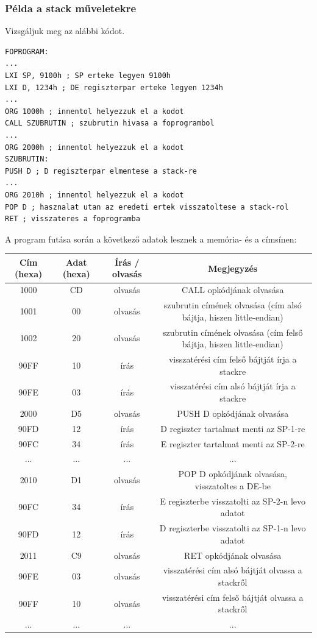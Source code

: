 \documentclass{article}
\begin{document}
\subsubsection{Példa a stack műveletekre}
Vizsgáljuk meg az alábbi kódot.
\begin{lstlisting}[frame=single]
FOPROGRAM:
...
LXI SP, 9100h ; SP erteke legyen 9100h
LXI D, 1234h ; DE regiszterpar erteke legyen 1234h
...
ORG 1000h ; innentol helyezzuk el a kodot
CALL SZUBRUTIN ; szubrutin hivasa a foprogrambol
...
ORG 2000h ; innentol helyezzuk el a kodot
SZUBRUTIN:
PUSH D ; D regiszterpar elmentese a stack-re
...
ORG 2010h ; innentol helyezzuk el a kodot
POP D ; hasznalat utan az eredeti ertek visszatoltese a stack-rol
RET ; visszateres a foprogramba
\end{lstlisting}
A program futása során a következő adatok lesznek a memória- és a címsínen:
\begin{center}
\begin{tabular}{ |c|c|c|c| } 
 \hline
 Cím (hexa) & Adat (hexa) & Írás / olvasás & Megjegyzés \\ \hline
 1000 & CD & olvasás & CALL opkódjának olvasása \\ \hline
 1001 & 00 & olvasás & szubrutin címének olvasása (cím alsó bájtja, hiszen little-endian) \\ \hline
 1002 & 20 & olvasás & szubrutin címének olvasása (cím felső bájtja, hiszen little-endian) \\ \hline
 90FF & 10 & írás & visszatérési cím felső bájtját írja a stackre \\ \hline
 90FE & 03 & írás & visszatérési cím alsó bájtját írja a stackre \\ \hline
 2000 & D5 & olvasás & PUSH D opkódjának olvasása \\ \hline
 90FD & 12 & írás & D regiszter tartalmat menti az SP-1-re \\ \hline
 90FC & 34 & írás & E regiszter tartalmat menti az SP-2-re \\ \hline
 ... & ... & ... & ... \\ \hline
 2010 & D1 & olvasás & POP D opkódjának olvasása, visszatoltes a DE-be \\ \hline
 90FC & 34 & írás & E regiszterbe visszatolti az SP-2-n levo adatot \\ \hline
 90FD & 12 & írás & D regiszterbe visszatolti az SP-1-n levo adatot \\ \hline
 2011 & C9 & olvasás & RET opkódjának olvasása \\ \hline
 90FE & 03 & olvasás & visszatérési cím alsó bájtját olvassa a stackről \\ \hline
 90FF & 10 & olvasás & visszatérési cím felső bájtját olvassa a stackről \\ \hline
 ... & ... & ... & ... \\ \hline
\end{tabular}
\end{center}
\end{document}
